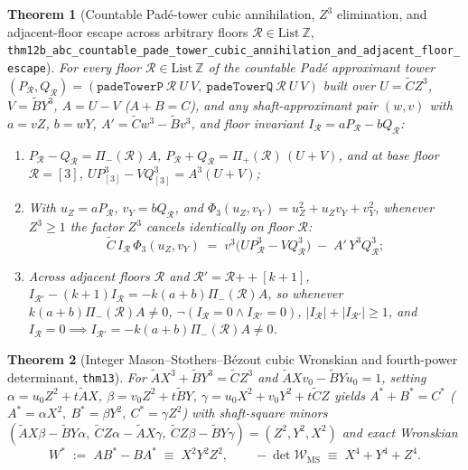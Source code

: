 \documentclass[11pt,a4paper]{article}
\theoremstyle{plain}
\newtheorem{theorem}{Theorem}[section]
\theoremstyle{definition}
\begin{document}
\begin{theorem}[Countable Pad\'e-tower cubic annihilation, $Z^3$ elimination, and adjacent-floor escape across arbitrary floors $\mathcal{R}\in\mathrm{List}\ \mathbb{Z}$, \texttt{thm12b\_abc\_countable\_pade\_tower\_cubic\_annihilation\_and\_adjacent\_floor\_escape}]
\label{thm:countable-pade-tower-thm12b}
For every floor $\mathcal{R}\in\mathrm{List}\ \mathbb{Z}$ of the countable Pad\'e approximant tower $(P_{\mathcal{R}},Q_{\mathcal{R}}) = (\texttt{padeTowerP}\ \mathcal{R}\ U\ V,\ \texttt{padeTowerQ}\ \mathcal{R}\ U\ V)$ built over $U = \widetilde{C}Z^3$, $V = \widetilde{B}Y^3$, $A = U - V$ ($A + B = C$), and any shaft-approximant pair $(w,v)$ with $a = v Z$, $b = w Y$, $A' = \widetilde{C}w^3 - \widetilde{B}v^3$, and floor invariant $I_{\mathcal{R}} = a P_{\mathcal{R}} - b Q_{\mathcal{R}}$:
\begin{enumerate}[label=\textbf{(\roman*)},leftmargin=*,noitemsep]
\item $P_{\mathcal{R}} - Q_{\mathcal{R}} = \Pi_-(\mathcal{R})\,A$, $P_{\mathcal{R}} + Q_{\mathcal{R}} = \Pi_+(\mathcal{R})\,(U + V)$, and at base floor $\mathcal{R} = [3]$, $U P_{[3]}^3 - V Q_{[3]}^3 = A^3(U + V)$;
\item With $u_Z = a P_{\mathcal{R}}$, $v_Y = b Q_{\mathcal{R}}$, and $\Phi_3(u_Z,v_Y) = u_Z^2 + u_Z v_Y + v_Y^2$, whenever $Z^3 \ge 1$ the factor $Z^3$ cancels identically on floor $\mathcal{R}$:
  \begin{equation}
    \label{eq:abc-arbitrary-floor-z3-cancel}
    \widetilde{C}\,I_{\mathcal{R}}\,\Phi_3(u_Z, v_Y) \;=\; v^3\bigl(U P_{\mathcal{R}}^3 - V Q_{\mathcal{R}}^3\bigr) \;-\; A'\,Y^3 Q_{\mathcal{R}}^3;
  \end{equation}
\item Across adjacent floors $\mathcal{R}$ and $\mathcal{R}' = \mathcal{R}\mathbin{++}[k+1]$, $I_{\mathcal{R}'} - (k+1)I_{\mathcal{R}} = -k(a+b)\Pi_-(\mathcal{R})A$, so whenever $k(a+b)\Pi_-(\mathcal{R})A \ne 0$, $\neg(I_{\mathcal{R}} = 0 \land I_{\mathcal{R}'} = 0)$, $|I_{\mathcal{R}}| + |I_{\mathcal{R}'}| \ge 1$, and $I_{\mathcal{R}} = 0 \implies I_{\mathcal{R}'} = -k(a+b)\Pi_-(\mathcal{R})A \ne 0$.
\end{enumerate}
\end{theorem}

\begin{theorem}[Integer Mason--Stothers--B\'ezout cubic Wronskian and fourth-power determinant, \texttt{thm13}]
\label{thm:mason-stothers-thm13}
For $\widetilde{A}X^3 + \widetilde{B}Y^3 = \widetilde{C}Z^3$ and $\widetilde{A}Xv_0 - \widetilde{B}Yu_0 = 1$, setting $\alpha = u_0 Z^2 + t\widetilde{A}X$, $\beta = v_0 Z^2 + t\widetilde{B}Y$, $\gamma = u_0 X^2 + v_0 Y^2 + t\widetilde{C}Z$ yields $A^*+B^*=C^*$ ($A^*=\alpha X^2,\ B^*=\beta Y^2,\ C^*=\gamma Z^2$) with shaft-square minors $(\widetilde{A}X\beta-\widetilde{B}Y\alpha,\ \widetilde{C}Z\alpha-\widetilde{A}X\gamma,\ \widetilde{C}Z\beta-\widetilde{B}Y\gamma) = (Z^2,Y^2,X^2)$ and exact Wronskian
\begin{equation}
  \label{eq:ms-wronskian}
  W^* \;:=\; A B^* - B A^* \;\equiv\; X^2 Y^2 Z^2,\qquad
  -\det\mathcal{W}_{\mathrm{MS}} \;\equiv\; X^4 + Y^4 + Z^4.
\end{equation}
\end{theorem}
\end{document}
